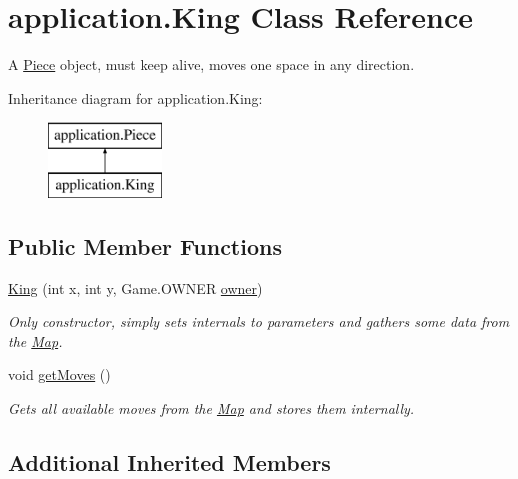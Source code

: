\hypertarget{classapplication_1_1_king}{\section{application.\+King Class Reference}
\label{classapplication_1_1_king}
}


A \hyperlink{classapplication_1_1_piece}{Piece} object, must keep alive, moves one space in any direction.  


Inheritance diagram for application.\+King\+:\begin{figure}[H]
\begin{center}
\leavevmode
\includegraphics[height=2.000000cm]{classapplication_1_1_king}
\end{center}
\end{figure}
\subsection*{Public Member Functions}
\begin{DoxyCompactItemize}
\item 
\hyperlink{classapplication_1_1_king_aaf752b3e54e7ef1c51263c2493212a5f}{King} (int x, int y, Game.\+O\+W\+N\+E\+R \hyperlink{classapplication_1_1_piece_a724f116bd99a66a6f6bcc8b7b35de131}{owner})
\begin{DoxyCompactList}\small\item\em Only constructor, simply sets internals to parameters and gathers some data from the \hyperlink{classapplication_1_1_map}{Map}. \end{DoxyCompactList}\item 
\hypertarget{classapplication_1_1_king_adb6361fe24a37fbe385e8e3aa626163e}{void \hyperlink{classapplication_1_1_king_adb6361fe24a37fbe385e8e3aa626163e}{get\+Moves} ()}\label{classapplication_1_1_king_adb6361fe24a37fbe385e8e3aa626163e}

\begin{DoxyCompactList}\small\item\em Gets all available moves from the \hyperlink{classapplication_1_1_map}{Map} and stores them internally. \end{DoxyCompactList}\end{DoxyCompactItemize}
\subsection*{Additional Inherited Members}


